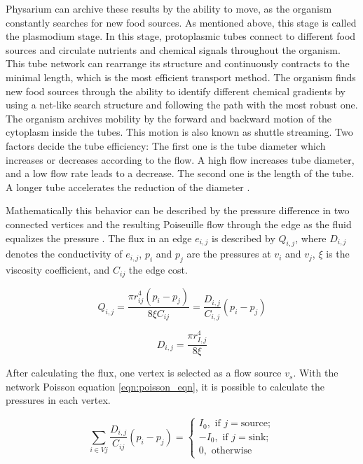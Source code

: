 Physarium can archive these results by the ability to move, as the organism constantly searches for new food sources. As mentioned above, this stage is called the plasmodium stage. In this stage, protoplasmic tubes connect to different food sources and circulate nutrients and chemical signals throughout the organism. This tube network can rearrange its structure and continuously contracts to the minimal length, which is the most efficient transport method. The organism finds new food sources through the ability to identify different chemical gradients by using a net-like search structure and following the path with the most robust one. The organism archives mobility by the forward and backward motion of the cytoplasm inside the tubes. This motion is also known as shuttle streaming. Two factors decide the tube efficiency: The first one is the tube diameter which increases or decreases according to the flow. A high flow increases tube diameter, and a low flow rate leads to a decrease. The second one is the length of the tube. A longer tube accelerates the reduction of the diameter \cite{adamatzky2016advances, tero_mathematical_2007}. 

Mathematically this behavior can be described by the pressure difference in two connected vertices and the resulting Poiseuille flow through the edge as the fluid equalizes the pressure \cite{liu_physarum_2015}. The flux in an edge $e_{i,j}$ is described by $Q_{i,j}$, where $D_{i,j}$ denotes the conductivity of $e_{i,j}$, $p_{i}$ and $p_{j}$ are the pressures at $v_i$ and $v_j$, $\xi$ is the viscosity coefficient, and $C_{ij}$ the edge cost. 

\begin{equation}
    \label{eqn:flux}
    Q_{i,j} = \frac{\pi r^{4}_{ij}(p_i-p_j)}{8 \xi C_{ij}} = \frac{D_{i,j}}{C_{i,j}}(p_i-p_j)
\end{equation}

\begin{equation}
    \label{eqn:conductivity_eqn}
    D_{i, j} = \frac{\pi r_{I,j}^{4}}{8\xi}
\end{equation}

After calculating the flux, one vertex is selected as a flow source $v_s$.
With the network Poisson equation \autoref{eqn:poisson_eqn}, it is possible to calculate the pressures in each vertex. 

\begin{equation}
    \label{eqn:poisson_eqn}
    \sum\limits_{i \in V{j}} \frac{D_{i,j}}{C_{ij}}(p_i-p_j) = \begin{cases}
        I_0, \text{ if } j = \text{source}; \\
        -I_0, \text{ if } j = \text{sink}; \\
        0, \text{ otherwise}
    \end{cases}
\end{equation}

